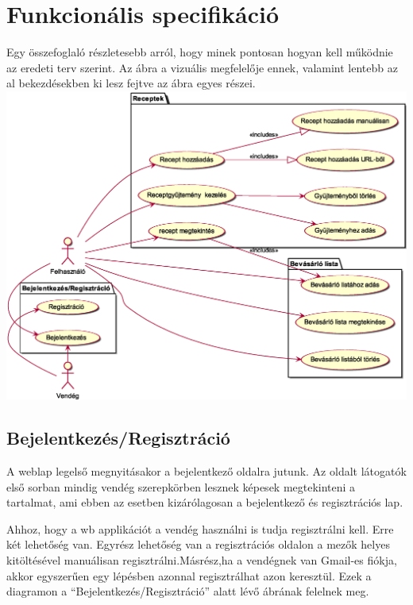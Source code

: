 \documentclass[12pt]{report}
\theoremstyle{definition}
\begin{document}

\chapter{Funkcionális specifikáció}
Egy összefoglaló részletesebb arról, hogy minek pontosan hogyan kell működnie az eredeti terv szerint. Az ábra a vizuális megfelelője ennek, valamint lentebb az al bekezdésekben ki lesz fejtve az ábra egyes részei. \\

\noindent
\includegraphics[width=\textwidth]{out/diagrams/useCase/use-case.eps}


\section{Bejelentkezés/Regisztráció}
A weblap legelső megnyitásakor a bejelentkező oldalra jutunk. Az oldalt látogatók első sorban mindig vendég szerepkörben lesznek képesek megtekinteni a tartalmat, ami ebben az esetben kizárólagosan a bejelentkező és regisztrációs lap. 

Ahhoz, hogy a wb applikációt a vendég használni is tudja regisztrálni kell. Erre két lehetőség van. Egyrész lehetőség van a regisztrációs oldalon a mezők helyes kitöltésével manuálisan regisztrálni.Másrész,ha a vendégnek van Gmail-es fiókja, akkor egyszerűen egy lépésben azonnal regisztrálhat azon keresztül. Ezek a diagramon a “Bejelentkezés/Regisztráció” alatt lévő ábrának felelnek meg.
\end{document}
